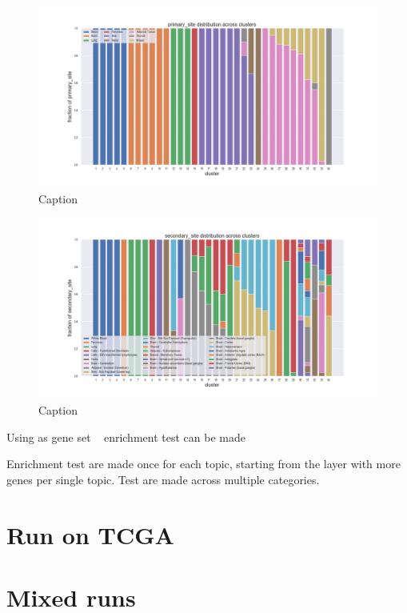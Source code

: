 \begin{figure}[htb!]
    \centering
    \includegraphics[width=0.9\linewidth]{pictures/topic/gtex/oversigma_10tissue/fraction_clustercomposition_l2_primary_site.png}
    \caption{Caption}
    \label{fig:topic/gtex/oversigma_10tissue/fraction_clustercomposition_l2_primary_site}
\end{figure}

\begin{figure}[htb!]
    \centering
    \includegraphics[width=0.9\linewidth]{pictures/topic/gtex/oversigma_10tissue/fraction_clustercomposition_l2_secondary_site.png}
    \caption{Caption}
    \label{fig:topic/gtex/oversigma_10tissue/fraction_clustercomposition_l2_secondary_site}
\end{figure}


Using as gene set ~\cite{Ardlie2015} enrichment test can be made \cite{Kuleshov2016}

Enrichment test are made once for each topic, starting from the layer with more genes per 
single topic. Test are made across multiple categories.

\section{Run on TCGA}

\section{Mixed runs}

